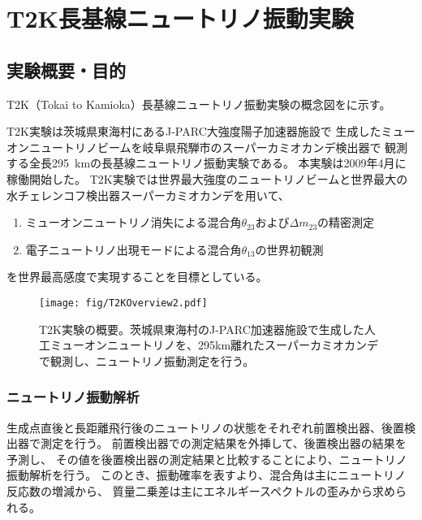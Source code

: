 \chapter{T2K長基線ニュートリノ振動実験}

\section{実験概要・目的}
T2K（Tokai to Kamioka）長基線ニュートリノ振動実験の概念図をに示す。

T2K実験\cite{jhfnu}は茨城県東海村にあるJ-PARC大強度陽子加速器施設で
生成したミューオンニュートリノビームを岐阜県飛騨市のスーパーカミオカンデ検出器で
観測する全長\qty{295}{\km}の長基線ニュートリノ振動実験である。
本実験は2009年4月に稼働開始した。
T2K実験では世界最大強度のニュートリノビームと世界最大の水チェレンコフ検出器スーパーカミオカンデを用いて、

\begin{enumerate}
\item ミューオンニュートリノ消失による混合角$\theta_{23}$および$\Delta m_{23}$の精密測定
\item 電子ニュートリノ出現モードによる混合角$\theta_{13}$の世界初観測
\end{enumerate}

を世界最高感度で実現することを目標としている。

\begin{figure}[htbp]
\centering
\texttt{[image: fig/T2KOverview2.pdf]}
\caption[T2K実験の概要]{T2K実験の概要。茨城県東海村のJ-PARC加速器施設で生成した人工ミューオンニュートリノを、295km離れたスーパーカミオカンデで観測し、ニュートリノ振動測定を行う。}
\label{T2KOverview}
\end{figure}

\subsection{ニュートリノ振動解析}

生成点直後と長距離飛行後のニュートリノの状態をそれぞれ前置検出器、後置検出器で測定を行う。
前置検出器での測定結果を外挿して、後置検出器の結果を予測し、
その値を後置検出器の測定結果と比較することにより、ニュートリノ振動解析を行う。
このとき、振動確率を表すより、混合角は主にニュートリノ反応数の増減から、
質量二乗差は主にエネルギースペクトルの歪みから求められる。

